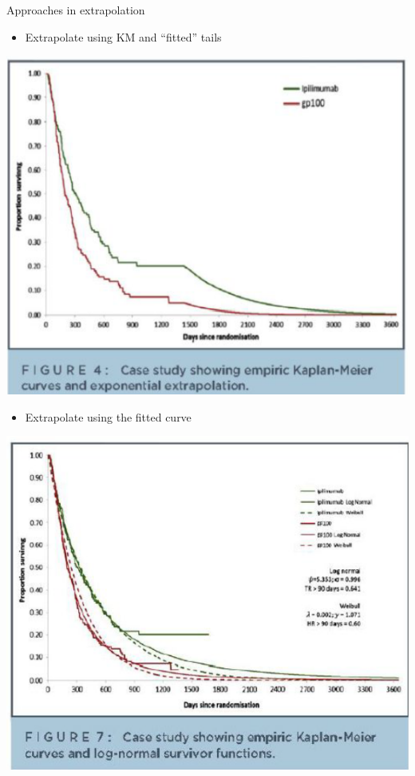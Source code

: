 \documentclass[ignorenonframetext,]{beamer}
\providecommand{\tightlist}{%
  \setlength{\itemsep}{0pt}\setlength{\parskip}{0pt}}
\begin{document}
\begin{frame}{Approaches in extrapolation}

\begin{itemize}
\tightlist
\item
  Extrapolate using KM and ``fitted'' tails
\end{itemize}

\includegraphics[width=1\linewidth]{figures/figure4means}

\end{frame}

\begin{frame}

\begin{itemize}
\tightlist
\item
  Extrapolate using the fitted curve
\end{itemize}

\includegraphics[width=1\linewidth]{figures/figure7means}

\end{frame}
\end{document}
